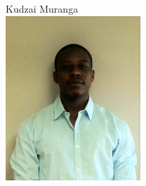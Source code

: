 \documentclass[a4paper,12pt]{article}
\begin{document}
\newpage

\begin{center}
{\Large Kudzai {Muranga}} \\[0.3cm]
\includegraphics[width= 2in]{Kudzai.jpg}\\[0.4cm] 
\end{center}
\end{document}
